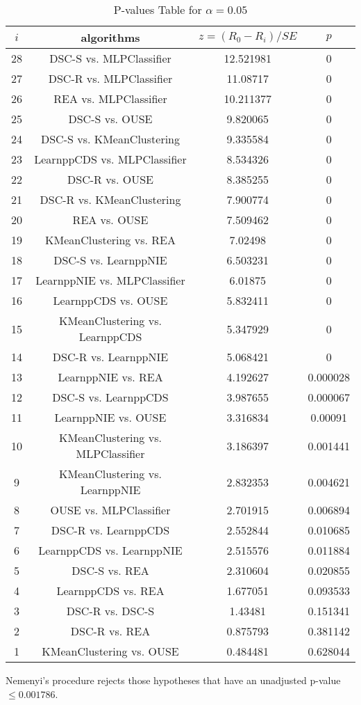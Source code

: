\documentclass[a4paper,10pt]{article}
\begin{document}
\begin{landscape}
\begin{table}[!htp]
\centering\scriptsize
\begin{tabular}{cccc}
$i$&algorithms&$z=(R_0 - R_i)/SE$&$p$\\
\hline28&DSC-S vs. MLPClassifier&12.521981&0\\
27&DSC-R vs. MLPClassifier&11.08717&0\\
26&REA vs. MLPClassifier&10.211377&0\\
25&DSC-S vs. OUSE&9.820065&0\\
24&DSC-S vs. KMeanClustering&9.335584&0\\
23&LearnppCDS vs. MLPClassifier&8.534326&0\\
22&DSC-R vs. OUSE&8.385255&0\\
21&DSC-R vs. KMeanClustering&7.900774&0\\
20&REA vs. OUSE&7.509462&0\\
19&KMeanClustering vs. REA&7.02498&0\\
18&DSC-S vs. LearnppNIE&6.503231&0\\
17&LearnppNIE vs. MLPClassifier&6.01875&0\\
16&LearnppCDS vs. OUSE&5.832411&0\\
15&KMeanClustering vs. LearnppCDS&5.347929&0\\
14&DSC-R vs. LearnppNIE&5.068421&0\\
13&LearnppNIE vs. REA&4.192627&0.000028\\
12&DSC-S vs. LearnppCDS&3.987655&0.000067\\
11&LearnppNIE vs. OUSE&3.316834&0.00091\\
10&KMeanClustering vs. MLPClassifier&3.186397&0.001441\\
9&KMeanClustering vs. LearnppNIE&2.832353&0.004621\\
8&OUSE vs. MLPClassifier&2.701915&0.006894\\
7&DSC-R vs. LearnppCDS&2.552844&0.010685\\
6&LearnppCDS vs. LearnppNIE&2.515576&0.011884\\
5&DSC-S vs. REA&2.310604&0.020855\\
4&LearnppCDS vs. REA&1.677051&0.093533\\
3&DSC-R vs. DSC-S&1.43481&0.151341\\
2&DSC-R vs. REA&0.875793&0.381142\\
1&KMeanClustering vs. OUSE&0.484481&0.628044\\
\hline
\end{tabular}
\caption{P-values Table for $\alpha=0.05$}
\end{table}Nemenyi's procedure rejects those hypotheses that have an unadjusted p-value $\le0.001786$.


\end{landscape}
\end{document}
